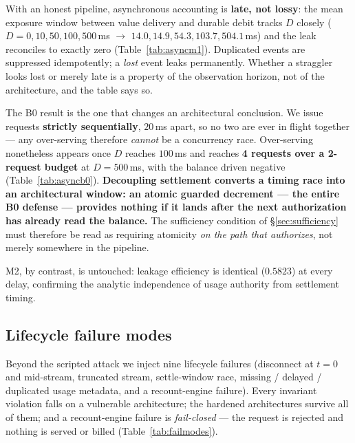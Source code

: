\documentclass[11pt]{article}
\begin{document}
With an honest pipeline, asynchronous accounting is \textbf{late, not lossy}: the mean
exposure window between value delivery and durable debit tracks $D$ closely
($D=0,10,50,100,500$\,ms $\rightarrow$ $14.0,14.9,54.3,103.7,504.1$\,ms) and the leak
reconciles to exactly zero (Table~\ref{tab:asyncm1}). Duplicated events are suppressed
idempotently; a \emph{lost} event leaks permanently. Whether a straggler looks lost or
merely late is a property of the observation horizon, not of the architecture, and the
table says so.

The B0 result is the one that changes an architectural conclusion. We issue requests
\textbf{strictly sequentially}, $20$\,ms apart, so no two are ever in flight together ---
any over-serving therefore \emph{cannot} be a concurrency race. Over-serving nonetheless
appears once $D$ reaches $100$\,ms and reaches \textbf{4 requests over a 2-request budget}
at $D=500$\,ms, with the balance driven negative (Table~\ref{tab:asyncb0}).
\textbf{Decoupling settlement converts a timing race into an architectural window: an
atomic guarded decrement --- the entire B0 defense --- provides nothing if it lands after
the next authorization has already read the balance.} The sufficiency condition of
\S\ref{sec:sufficiency} must therefore be read as requiring atomicity \emph{on the path
that authorizes}, not merely somewhere in the pipeline.

M2, by contrast, is untouched: leakage efficiency is identical ($0.5823$) at every delay,
confirming the analytic independence of usage authority from settlement timing.







\subsection{Lifecycle failure modes}
Beyond the scripted attack we inject nine lifecycle failures (disconnect at $t{=}0$ and
mid-stream, truncated stream, settle-window race, missing / delayed / duplicated usage
metadata, and a recount-engine failure). Every invariant violation falls on a vulnerable
architecture; the hardened architectures survive all of them; and a recount-engine failure
is \emph{fail-closed} --- the request is rejected and nothing is served or billed
(Table~\ref{tab:failmodes}).
\end{document}
